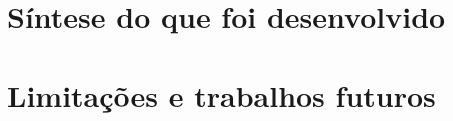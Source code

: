 \section{Síntese do que foi desenvolvido}
\label{cap-consideracoes-sintese}

\section{Limitações e trabalhos futuros}
\label{cap-consideracoes-limitacoes-futuros}
